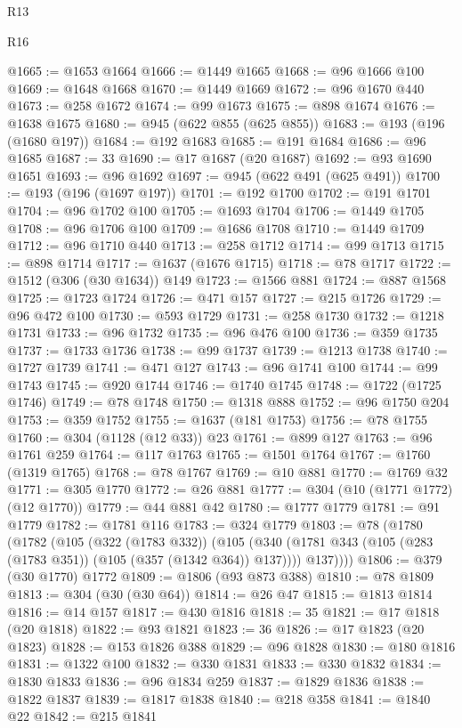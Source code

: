 \begin{lexlean}{R13}
\begin{lexlean}{R16}
\begin{coremodule}
{{{{{{{{{{{{{{{{{{{{{{{{{{{{{{{{{{{{{{{{{{{{{{{{{{{{{{{{{{{{{{{{{{{{{{{{{{{{{{{{{{{{{{{{{{{{{{{{{{{{{{{{{{{{{{{{{@1665 := @1653 @1664
@1666 := @1449 @1665
@1668 := @96 @1666 @100
@1669 := @1648 @1668
@1670 := @1449 @1669
@1672 := @96 @1670 @440
@1673 := @258 @1672
@1674 := @99 @1673
@1675 := @898 @1674
@1676 := @1638 @1675
@1680 := @945 (@622 @855 (@625 @855))
@1683 := @193 (@196 (@1680 @197))
@1684 := @192 @1683
@1685 := @191 @1684
@1686 := @96 @1685
@1687 := 33
@1690 := @17 @1687 (@20 @1687)
@1692 := @93 @1690 @1651
@1693 := @96 @1692
@1697 := @945 (@622 @491 (@625 @491))
@1700 := @193 (@196 (@1697 @197))
@1701 := @192 @1700
@1702 := @191 @1701
@1704 := @96 @1702 @100
@1705 := @1693 @1704
@1706 := @1449 @1705
@1708 := @96 @1706 @100
@1709 := @1686 @1708
@1710 := @1449 @1709
@1712 := @96 @1710 @440
@1713 := @258 @1712
@1714 := @99 @1713
@1715 := @898 @1714
@1717 := @1637 (@1676 @1715)
@1718 := @78 @1717
@1722 := @1512 (@306 (@30 @1634)) @149
@1723 := @1566 @881
@1724 := @887 @1568
@1725 := @1723 @1724
@1726 := @471 @157
@1727 := @215 @1726
@1729 := @96 @472 @100
@1730 := @593 @1729
@1731 := @258 @1730
@1732 := @1218 @1731
@1733 := @96 @1732
@1735 := @96 @476 @100
@1736 := @359 @1735
@1737 := @1733 @1736
@1738 := @99 @1737
@1739 := @1213 @1738
@1740 := @1727 @1739
@1741 := @471 @127
@1743 := @96 @1741 @100
@1744 := @99 @1743
@1745 := @920 @1744
@1746 := @1740 @1745
@1748 := @1722 (@1725 @1746)
@1749 := @78 @1748
@1750 := @1318 @888
@1752 := @96 @1750 @204
@1753 := @359 @1752
@1755 := @1637 (@181 @1753)
@1756 := @78 @1755
@1760 := @304 (@1128 (@12 @33)) @23
@1761 := @899 @127
@1763 := @96 @1761 @259
@1764 := @117 @1763
@1765 := @1501 @1764
@1767 := @1760 (@1319 @1765)
@1768 := @78 @1767
@1769 := @10 @881
@1770 := @1769 @32
@1771 := @305 @1770
@1772 := @26 @881
@1777 := @304 (@10 (@1771 @1772) (@12 @1770))
@1779 := @44 @881 @42
@1780 := @1777 @1779
@1781 := @91 @1779
@1782 := @1781 @116
@1783 := @324 @1779
@1803 := @78
    (@1780
      (@1782
        (@105
          (@322 (@1783 @332))
          (@105
            (@340 (@1781 @343 (@105 (@283 (@1783 @351)) (@105 (@357 (@1342 @364)) @137))))
            @137))))
@1806 := @379 (@30 @1770) @1772
@1809 := @1806 (@93 @873 @388)
@1810 := @78 @1809
@1813 := @304 (@30 (@30 @64))
@1814 := @26 @47
@1815 := @1813 @1814
@1816 := @14 @157
@1817 := @430 @1816
@1818 := 35
@1821 := @17 @1818 (@20 @1818)
@1822 := @93 @1821
@1823 := 36
@1826 := @17 @1823 (@20 @1823)
@1828 := @153 @1826 @388
@1829 := @96 @1828
@1830 := @180 @1816
@1831 := @1322 @100
@1832 := @330 @1831
@1833 := @330 @1832
@1834 := @1830 @1833
@1836 := @96 @1834 @259
@1837 := @1829 @1836
@1838 := @1822 @1837
@1839 := @1817 @1838
@1840 := @218 @358
@1841 := @1840 @22
@1842 := @215 @1841
}}}}}}}}}}}}}}}}}}}}}}}}}}}}}}}}}}}}}}}}}}}}}}}}}}}}}}}}}}}}}}}}}}}}}}}}}}}}}}}}}}}}}}}}}}}}}}}}}}}}}}}}}}}}}}}}}
\end{coremodule}
\end{lexlean}
\end{lexlean}
